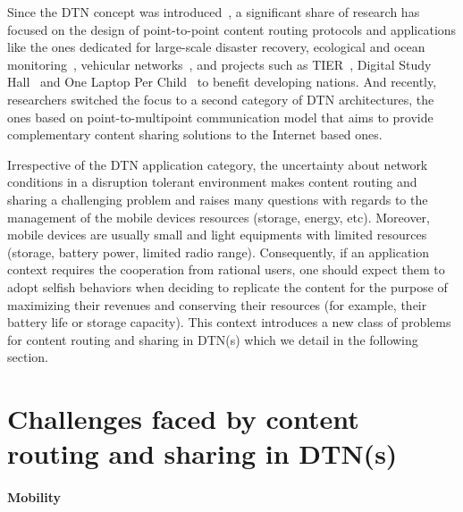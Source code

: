 Since the DTN concept was introduced~\cite{dtnrg}, a significant share of research has focused on the design of point-to-point content routing protocols and applications like the ones dedicated for large-scale disaster recovery, ecological and ocean monitoring~\cite{Juang:zebranet, Heidemann:Acoustic}, vehicular networks~\cite{Levine:MaxProp}, and projects such as TIER~\cite{TIER}, Digital Study Hall~\cite{DSH} and One Laptop Per Child~\cite{OneLaptopPerChild} to benefit developing nations. And recently, researchers switched the focus to a second category of DTN architectures, the ones based on point-to-multipoint communication model that aims to provide complementary content sharing solutions to the Internet based ones. 

Irrespective of the DTN application category, the uncertainty about network conditions in a disruption tolerant environment makes content routing and sharing a challenging problem and raises many questions with regards to the management of the mobile devices resources (storage, energy, etc). Moreover, mobile devices are usually small and light equipments with limited resources (storage, battery power, limited radio range). Consequently, if an application context requires the cooperation from rational users, one should expect them to adopt selfish behaviors when deciding to replicate the content for the purpose of maximizing their revenues and conserving their resources (for example, their battery life or storage capacity). This context introduces a new class of problems for content routing and sharing in DTN(s) which we detail in the following section.

\section{Challenges faced by content routing and sharing in DTN(s)}

\paragraph{Mobility}

